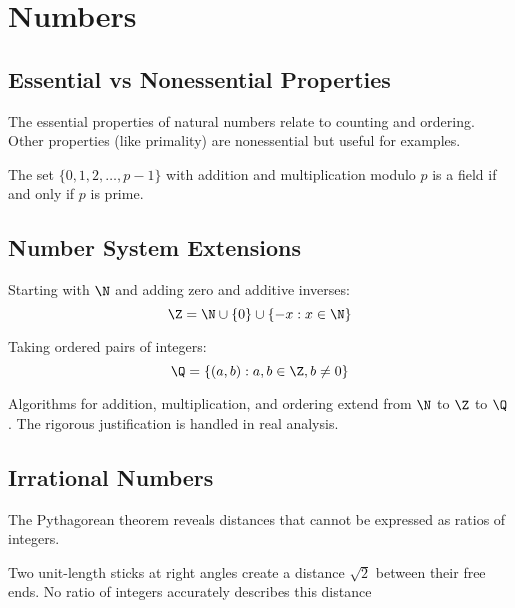 \section{Numbers}

\subsection{Essential vs Nonessential Properties}

\begin{note}
    The essential properties of natural numbers relate to counting and ordering. Other properties (like primality) are nonessential but useful for examples.
\end{note}

\begin{eg}
    The set $\{0, 1, 2, \ldots, p-1\}$ with addition and multiplication modulo $p$ is a field if and only if $p$ is prime.
\end{eg}

\subsection{Number System Extensions}

\begin{definition*}[Integers]\label{def:integers}
    Starting with $\N$ and adding zero and additive inverses:
    \[
        \Z = \N \cup \{0\} \cup \{-x : x \in \N\}
    \]
\end{definition*}

\begin{definition*}[Rationals]\label{def:rationals}
    Taking ordered pairs of integers:
    \[
        \Q = \left\{\left(a,b\right): a, b \in \Z, b \neq 0\right\}
    \]
\end{definition*}

\begin{note}
    Algorithms for addition, multiplication, and ordering extend from $\N$ to $\Z$ to $\Q$. The rigorous justification is handled in real analysis.
\end{note}

\subsection{Irrational Numbers}

The Pythagorean theorem reveals distances that cannot be expressed as ratios of integers.

\begin{eg}
    Two unit-length sticks at right angles create a distance $\sqrt{2}$ between their free ends. No ratio of integers accurately describes this distance
\end{eg}

